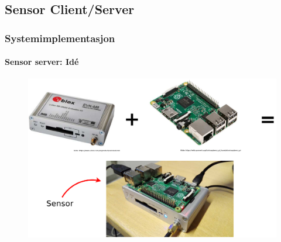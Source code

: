 \documentclass[xcolor=table]{beamer}
\begin{document}
\subsection{Sensor Client/Server}
\begin{frame}
\frametitle{Systemimplementasjon}
  \framesubtitle{Sensor server: Idé}
    \begin{figure}
      \includegraphics[scale=0.2]{thesis/graphics/raspi_gps.pdf}
    \end{figure}
\end{frame}
\end{document}
